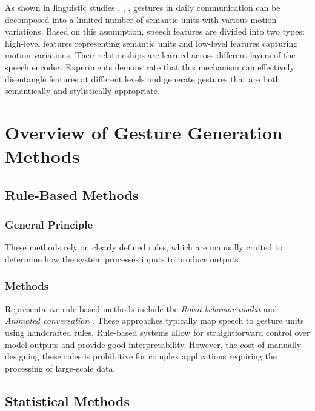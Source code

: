 As shown in linguistic studies \cite{kipp2005gesture}, \cite{neff2008gesture}, \cite{webb1997linguistic}, gestures in daily communication can be decomposed into a limited number of semantic units with various motion variations. Based on this assumption, speech features are divided into two types: high-level features representing semantic units and low-level features capturing motion variations. Their relationships are learned across different layers of the speech encoder. Experiments demonstrate that this mechanism can effectively disentangle features at different levels and generate gestures that are both semantically and stylistically appropriate.

\section{Overview of Gesture Generation Methods}
\label{sec:relatedwork}

\subsection{Rule-Based Methods}

\subsubsection{General Principle}

These methods rely on clearly defined rules, which are manually crafted to determine how the system processes inputs to produce outputs.

\subsubsection{Methods}

Representative rule-based methods include the \textit{Robot behavior toolkit} \cite{huang2012robot} and \textit{Animated conversation} \cite{cassell1994animated}. These approaches typically map speech to gesture units using handcrafted rules. Rule-based systems allow for straightforward control over model outputs and provide good interpretability.  
However, the cost of manually designing these rules is prohibitive for complex applications requiring the processing of large-scale data.

\subsection{Statistical Methods}


